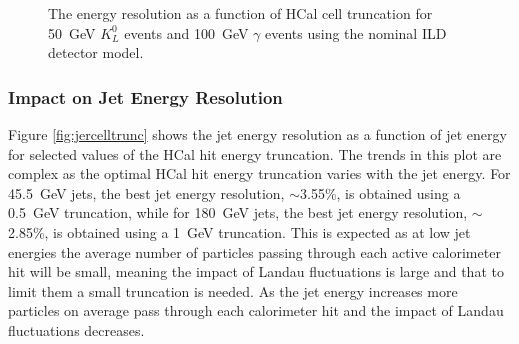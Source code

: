 \begin{figure}[h!]
\caption[The energy resolution as a function of HCal cell truncation for \protect{} 50~GeV $K^{0}_{L}$ events and \protect{} 100~GeV $\gamma$ events using the nominal ILD detector model.]{The energy resolution as a function of HCal cell truncation for \protect{} 50~GeV $K^{0}_{L}$ events and \protect{} 100~GeV $\gamma$ events using the nominal ILD detector model.}
\label{fig:ercelltrunc}
\end{figure}


\subsubsection{Impact on Jet Energy Resolution}
Figure \ref{fig:jercelltrunc} shows the jet energy resolution as a function of jet energy for selected values of the HCal hit energy truncation.  The trends in this plot are complex as the optimal HCal hit energy truncation varies with the jet energy.  For 45.5~GeV jets, the best jet energy resolution, $\sim$3.55\%, is obtained using a 0.5~GeV truncation, while for 180~GeV jets, the best jet energy resolution, $\sim$2.85\%, is obtained using a 1~GeV truncation.  This is expected as at low jet energies the average number of particles passing through each active calorimeter hit will be small, meaning the impact of Landau fluctuations is large and that to limit them a small truncation is needed.  As the jet energy increases more particles on average pass through each calorimeter hit and the impact of Landau fluctuations decreases.  

